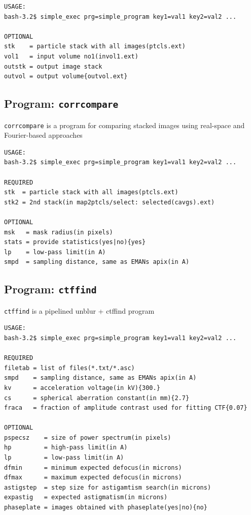 \documentclass[a4paper,11pt]{article}
\newcommand{\prgname}[1]{\textcolor{NavyBlue}{\texttt{#1}}}
\begin{document}
\begin{verbatim}
USAGE:
bash-3.2$ simple_exec prg=simple_program key1=val1 key2=val2 ...

OPTIONAL
stk    = particle stack with all images(ptcls.ext)
vol1   = input volume no1(invol1.ext)
outstk = output image stack
outvol = output volume{outvol.ext}
\end{verbatim}

\subsection{Program: \prgname{corrcompare}}
\label{corrcompare}
\prgname{corrcompare} is a program for comparing stacked images using real-space and Fourier-based approaches 

\begin{verbatim}
USAGE:
bash-3.2$ simple_exec prg=simple_program key1=val1 key2=val2 ...

REQUIRED
stk  = particle stack with all images(ptcls.ext)
stk2 = 2nd stack(in map2ptcls/select: selected(cavgs).ext)

OPTIONAL
msk   = mask radius(in pixels)
stats = provide statistics(yes|no){yes}
lp    = low-pass limit(in A)
smpd  = sampling distance, same as EMANs apix(in A)
\end{verbatim}

\subsection{Program: \prgname{ctffind}}
\label{ctffind}
\prgname{ctffind} is a pipelined unblur + ctffind program

\begin{verbatim}
USAGE:
bash-3.2$ simple_exec prg=simple_program key1=val1 key2=val2 ...

REQUIRED
filetab = list of files(*.txt/*.asc)
smpd    = sampling distance, same as EMANs apix(in A)
kv      = acceleration voltage(in kV){300.}
cs      = spherical aberration constant(in mm){2.7}
fraca   = fraction of amplitude contrast used for fitting CTF{0.07}

OPTIONAL
pspecsz    = size of power spectrum(in pixels)
hp         = high-pass limit(in A)
lp         = low-pass limit(in A)
dfmin      = minimum expected defocus(in microns)
dfmax      = maximum expected defocus(in microns)
astigstep  = step size for astigamtism search(in microns)
expastig   = expected astigmatism(in microns)
phaseplate = images obtained with phaseplate(yes|no){no}
\end{verbatim}
\end{document}
